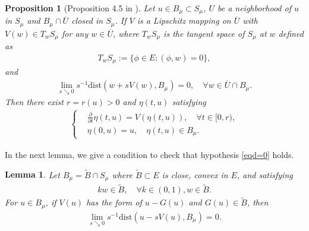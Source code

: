 \documentclass[10pt,a4paper]{article}
\newtheorem{lemma}[theorem]{Lemma}
\newtheorem{proposition}[theorem]{Proposition}
\theoremstyle{definition} \theoremstyle{remark}
\numberwithin{equation}{section}
\begin{document}
\begin{proposition}[Proposition 4.5 in \cite{JS}] \label{propbmmanifold}
	Let $u \in B_\mu \subset S_\mu$, $U$ be a neighborhood of $u$ in $S_\mu$ and $B_\mu \cap \overline{U}$ closed in $S_\mu$. If $V$ is a Lipschitz mapping on $\overline{U}$ with $V(w) \in T_wS_\mu$ for any $w \in \overline{U}$, where $T_wS_\mu$ is the tangent space of $S_\mu$ at $w$ defined as
	\begin{align*}
		T_wS_\mu := \bigl\{\phi \in E: (\phi,w) = 0\bigr\},
	\end{align*}
	and
	\begin{align} \label{eqd=0}
		\lim_{s \searrow 0}s^{-1}\text{dist}(w + sV(w),B_\mu) = 0, \quad \forall w \in \overline{U} \cap B_\mu.
	\end{align}
	Then  there exist $r = r(u) > 0$ and $\eta(t,u)$ satisfying
	\begin{align} \label{eqeta}
		\left\{
		\begin{aligned}
			& \frac{\partial}{\partial t}\eta(t,u) = V(\eta(t,u)), \quad \forall t \in [0,r), \\
			& \eta(0,u) = u, \quad \eta(t,u) \in B_\mu.
		\end{aligned}
		\right.
	\end{align}
\end{proposition}

In the next lemma, we give a condition to check that hypothesis \eqref{eqd=0} holds.

\begin{lemma} \label{lemconvex}
	Let $B_\mu = \tilde B \cap S_\mu$ where $\tilde B \subset E$ is close, convex in $E$, and satisfying
	\begin{align} \label{eqcone}
		kw \in \tilde B, \quad \forall k \in (0,1), w \in \tilde B.
	\end{align}
	For $u \in B_\mu$, if $V(u)$ has the form of $u - G(u)$ and $G(u) \in \tilde B$, then
	\begin{align} \label{eqd=0atapoint}
		\lim_{s \searrow 0}s^{-1}\text{dist}(u - sV(u),B_\mu) = 0.
	\end{align}
\end{lemma}
\end{document}
